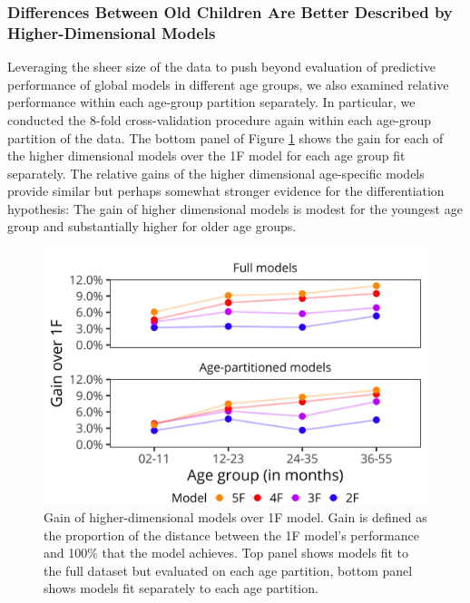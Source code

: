 \documentclass[man, floatsintext]{apa7}
\begin{document}
\subsubsection{Differences Between Old Children Are Better Described by
Higher-Dimensional
Models}

Leveraging the sheer size of the data to push beyond evaluation of predictive performance of global models in different age groups, we also examined relative performance within each age-group partition separately. In particular, we conducted the 8-fold cross-validation procedure again within each age-group partition of the data. The bottom panel of Figure \ref{fig:study1} shows the gain for
each of the higher dimensional models over the 1F model for each age
group fit separately. The relative gains of the higher dimensional age-specific models provide similar but perhaps somewhat stronger evidence for the differentiation hypothesis: The gain of higher dimensional
models is modest for the youngest age group and substantially higher for
older age groups.

\begin{figure}[t]
\centering
\includegraphics[width=5in]{figures/study1.png}
\caption{Gain of higher-dimensional models over 1F model. Gain is defined as the proportion of the distance between the 1F model’s performance and 100\% that the model achieves. Top panel shows models fit to the full dataset but evaluated on each age partition, bottom panel shows models fit separately to each age partition. 
}
\label{fig:study1}
\end{figure}
\end{document}
